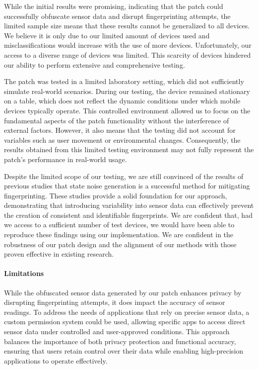 \documentclass[11pt,
  oneside,openany,    %
]{scrreprt}
\begin{document}
While the initial results were promising, indicating that the patch could successfully obfuscate sensor data and disrupt fingerprinting attempts, the limited sample size means that these results cannot be generalized to all devices.
We believe it is only due to our limited amount of devices used and misclassifications would increase with the use of more devices.
Unfortunately, our access to a diverse range of devices was limited.
This scarcity of devices hindered our ability to perform extensive and comprehensive testing.

The patch was tested in a limited laboratory setting, which did not sufficiently simulate real-world scenarios.
During our testing, the device remained stationary on a table, which does not reflect the dynamic conditions under which mobile devices typically operate.
This controlled environment allowed us to focus on the fundamental aspects of the patch functionality without the interference of external factors. 
However, it also means that the testing did not account for variables such as user movement or environmental changes. 
Consequently, the results obtained from this limited testing environment may not fully represent the patch's performance in real-world usage.

Despite the limited scope of our testing, we are still convinced of the results of previous studies that state noise generation is a successful method for mitigating fingerprinting.
These studies provide a solid foundation for our approach, demonstrating that introducing variability into sensor data can effectively prevent the creation of consistent and identifiable fingerprints.
We are confident that, had we access to a sufficient number of test devices, we would have been able to reproduce these findings using our implementation.
We are confident in the robustness of our patch design and the alignment of our methods with those proven effective in existing research.

\paragraph{Limitations}
\label{par:limitations}
While the obfuscated sensor data generated by our patch enhances privacy by disrupting fingerprinting attempts, it does impact the accuracy of sensor readings. 
To address the needs of applications that rely on precise sensor data, a custom permission system could be used, allowing specific apps to access direct sensor data under controlled and user-approved conditions. 
This approach balances the importance of both privacy protection and functional accuracy, ensuring that users retain control over their data while enabling high-precision applications to operate effectively.
\end{document}
